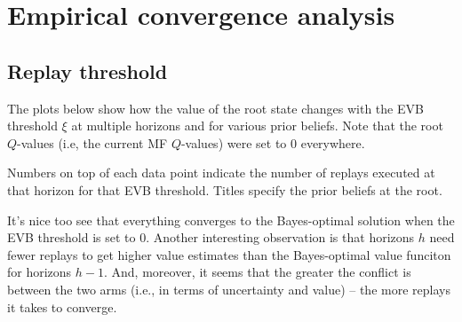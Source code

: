 \documentclass{article}
\begin{document}
\section*{Empirical convergence analysis}

\subsection*{Replay threshold}
The plots below show how the value of the root state changes with the EVB threshold $\xi$ at multiple horizons 
and for various prior beliefs. Note that the root $Q$-values (i.e, the current MF $Q$-values) were set to $0$ 
everywhere.

\bigbreak

Numbers on top of each data point indicate the number of replays executed at that horizon for that EVB threshold. 
Titles specify the prior beliefs at the root.

\bigbreak

It's nice too see that everything converges to the Bayes-optimal solution when the EVB threshold is set to $0$. 
Another interesting observation is that horizons $h$ need fewer replays to get higher value estimates than 
the Bayes-optimal value funciton for horizons $h-1$. And, moreover, it seems that the greater the conflict is 
between the two arms (i.e., in terms of uncertainty and value) -- the more replays it takes to converge.

\newpage
\end{document}
